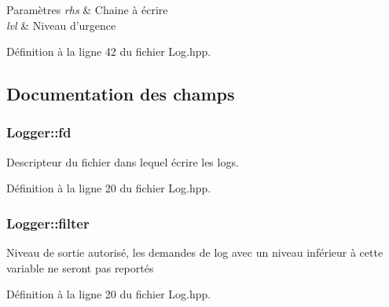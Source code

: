 \begin{DoxyParams}{Paramètres}
{\em rhs} & Chaine à écrire \\
\hline
{\em lvl} & Niveau d'urgence \\
\hline
\end{DoxyParams}


Définition à la ligne 42 du fichier Log.\+hpp.



\subsection{Documentation des champs}
\hypertarget{structLogger_aed0c1f4ae52e15c00906b158131a5775}{
\subsubsection[{fd}]{\setlength{\rightskip}{0pt plus 5cm}Logger\+::fd}}\label{structLogger_aed0c1f4ae52e15c00906b158131a5775}
Descripteur du fichier dans lequel écrire les logs. 

Définition à la ligne 20 du fichier Log.\+hpp.

\hypertarget{structLogger_ad2ee79af4600bdc5f362c999f86ae718}{
\subsubsection[{filter}]{\setlength{\rightskip}{0pt plus 5cm}Logger\+::filter}}\label{structLogger_ad2ee79af4600bdc5f362c999f86ae718}
Niveau de sortie autorisé, les demandes de log avec un niveau inférieur à cette variable ne seront pas reportés 

Définition à la ligne 20 du fichier Log.\+hpp.

